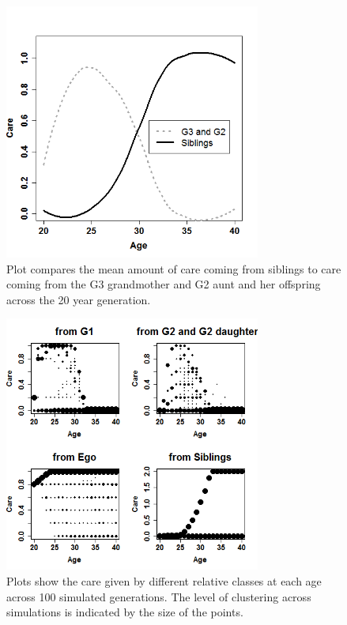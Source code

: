\begin{figure}[!ht]
  \includegraphics[width=0.75\textwidth]{Fig2.png}
\caption{Plot compares the mean amount of care coming from siblings to care coming from the G3 grandmother and G2 aunt and her offspring across the 20 year generation.}
\label{fig:simmns}
\end{figure}

\begin{figure}[!ht]
  \includegraphics[width=0.75\textwidth]{Fig3.png}

\caption{Plots show the care given by different relative classes at each age across 100 simulated generations.  The level of clustering across simulations is indicated by the size of the points.}
\label{fig:simputs}
\end{figure}

